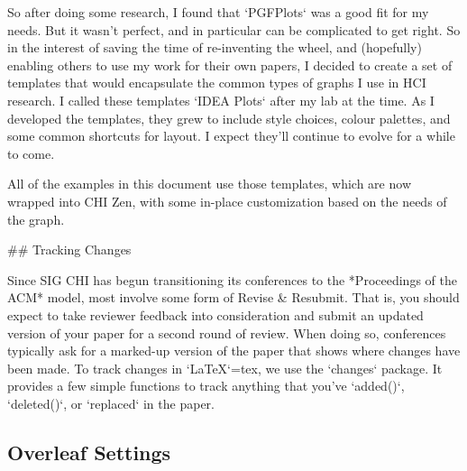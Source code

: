 \begin{markdown}
So after doing some research, I found that `PGFPlots` was a good fit for my needs. But it wasn't perfect, and in particular can be complicated to get right. So in the interest of saving the time of re-inventing the wheel, and (hopefully) enabling others to use my work for their own papers, I decided to create a set of templates that would encapsulate the common types of graphs I use in HCI research. I called these templates `IDEA Plots` after my lab at the time. As I developed the templates, they grew to include style choices, colour palettes, and some common shortcuts for layout. I expect they'll continue to evolve for a while to come.  

All of the examples in this document use those templates, which are now wrapped into CHI Zen, with some in-place customization based on the needs of the graph. 



## Tracking Changes

Since SIG CHI has begun transitioning its conferences to the *Proceedings of the ACM* model, most involve some form of Revise & Resubmit. That is, you should expect to take reviewer feedback into consideration and submit an updated version of your paper for a second round of review. When doing so, conferences typically ask for a marked-up version of the paper that shows where changes have been made.  To track changes in `\LaTeX{}`{=tex}, we use the `changes` package. It provides a few simple functions to track anything that you've `added()`, `deleted()`, or `replaced` in the paper. 



\end{markdown}

\subsection{Overleaf Settings}
\label{sec:overleaf}

